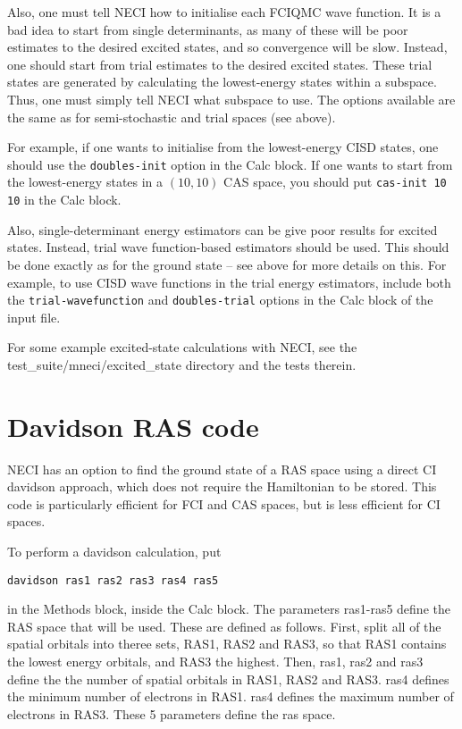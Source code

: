 \documentclass[a4paper,notitlepage,dvipsnames]{scrreprt}
\let\code\lstinline
\begin{document}
    Also, one must tell NECI how to initialise each FCIQMC wave function.
    It is a bad idea to start from single determinants, as many of these
    will be poor estimates to the desired excited states, and so
    convergence will be slow. Instead, one should start from trial estimates
    to the desired excited states. These trial states are generated by
    calculating the lowest-energy states within a subspace.
    Thus, one must simply tell NECI what subspace to use. The options
    available are the same as for semi-stochastic and trial spaces (see above).

    For example, if one wants to initialise from the lowest-energy CISD states,
    one should use the \code{doubles-init} option in the Calc block. If one
    wants to start from the lowest-energy states in a $(10,10)$ CAS space, you
    should put \code{cas-init 10 10} in the Calc block.

    Also, single-determinant energy estimators can be give poor results for
    excited states. Instead, trial wave function-based estimators should be
    used. This should be done exactly as for the ground state -- see above for
    more details on this. For example, to use CISD wave functions in the trial
    energy estimators, include both the \code{trial-wavefunction} and
    \code{doubles-trial} options in the Calc block of the input file.

    For some example excited-state calculations with NECI, see the
    test\_suite/mneci/excited\_state directory and the tests therein.

\section{Davidson RAS code}

    NECI has an option to find the ground state of a RAS space using a
    direct CI davidson approach, which does not require the Hamiltonian to be
    stored. This code is particularly efficient for FCI and CAS spaces, but is
    less efficient for CI spaces.

    To perform a davidson calculation, put
    \begin{lstlisting}[gobble=4]
    	davidson ras1 ras2 ras3 ras4 ras5
    \end{lstlisting}
    in the Methods block, inside the Calc block. The parameters ras1-ras5 define
    the RAS space that will be used. These are defined as follows. First,
    split all of the spatial orbitals into theree sets, RAS1, RAS2 and RAS3,
    so that RAS1 contains the lowest energy orbitals, and RAS3 the highest.
    Then, ras1, ras2 and ras3 define the the number of spatial orbitals in
    RAS1, RAS2 and RAS3. ras4 defines the minimum number of electrons in RAS1.
    ras4 defines the maximum number of electrons in RAS3. These 5 parameters
    define the ras space.
\end{document}
